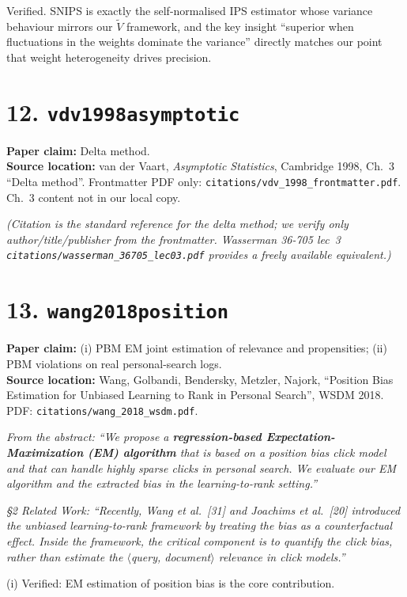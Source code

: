 \documentclass[11pt]{article}
\newcommand{\paperclaim}[1]{\textbf{Paper claim:} #1}
\newcommand{\source}[1]{\textbf{Source location:} #1}
\newcommand{\quoted}[1]{\begin{tcolorbox}\textit{#1}\end{tcolorbox}}
\begin{document}
\noindent Verified. SNIPS is exactly the self-normalised IPS estimator
whose variance behaviour mirrors our $\widetilde V$ framework, and the
key insight ``superior when fluctuations in the weights dominate the
variance'' directly matches our point that weight heterogeneity drives
precision.

\bigskip

\section*{12. \texttt{vdv1998asymptotic}}
\paperclaim{Delta method.}\\
\source{van der Vaart, \emph{Asymptotic Statistics}, Cambridge 1998, Ch.~3
``Delta method''. Frontmatter PDF only:
\texttt{citations/vdv\_1998\_frontmatter.pdf}. Ch.~3 content not in our
local copy.}

\quoted{(Citation is the standard reference for the delta method; we
verify only author/title/publisher from the frontmatter. Wasserman 36-705
lec~3 \texttt{citations/wasserman\_36705\_lec03.pdf} provides a freely
available equivalent.)}

\bigskip

\section*{13. \texttt{wang2018position}}
\paperclaim{(i) PBM EM joint estimation of relevance and propensities;
(ii) PBM violations on real personal-search logs.}\\
\source{Wang, Golbandi, Bendersky, Metzler, Najork, ``Position Bias
Estimation for Unbiased Learning to Rank in Personal Search'', WSDM 2018.
PDF: \texttt{citations/wang\_2018\_wsdm.pdf}.}

\quoted{From the abstract: ``We propose a \textbf{regression-based
Expectation-Maximization (EM) algorithm} that is based on a position bias
click model and that can handle highly sparse clicks in personal search.
We evaluate our EM algorithm and the extracted bias in the
learning-to-rank setting.''}

\quoted{\S2 Related Work: ``Recently, Wang et al.\ [31] and Joachims et
al.\ [20] introduced the unbiased learning-to-rank framework by treating
the bias as a counterfactual effect. Inside the framework, the critical
component is to quantify the click bias, rather than estimate the
$\langle$query, document$\rangle$ relevance in click models.''}

\noindent (i) Verified: EM estimation of position bias is the core
contribution.
\end{document}
